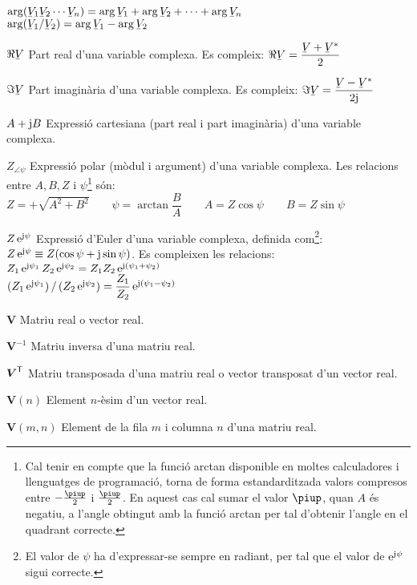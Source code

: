 \begin{list}{}
      $\arg(\cmplx{V}_1 \cmplx{V}_2 \cdots \cmplx{V}_n) = \arg\cmplx{V}_1 + \arg \cmplx{V}_2 + \cdots + \arg\cmplx{V}_n$\\[1ex]
      $\arg(\cmplx{V}_1 / \cmplx{V}_2) = \arg\cmplx{V}_1 - \arg \cmplx{V}_2$
    \item[$\Re\cmplx{V}$] Part real d'una variable complexa. Es compleix: $\Re\cmplx{V} = \dfrac{\cmplx{V} + \cmplx{V}^*}{2}$
    \item[$\Im\cmplx{V}$] Part imaginària d'una variable complexa. Es compleix: $\Im\cmplx{V} = \dfrac{\cmplx{V} - \cmplx{V}^*}{2 \ju}$
    \item[$A+\mathrm{j} B$] Expressió cartesiana (part real i part
    imaginària) d'una variable complexa.
    \item[$Z_{\angle \psi}$] Expressió polar (mòdul i argument) d'una variable
    complexa. Les relacions entre $A, B, Z$ i $\psi$\footnote{Cal tenir en compte que la funció \textsf{arctan} disponible en moltes calculadores i llenguatges de programació, torna de forma  estandarditzada valors compresos entre $-\frac{\piup}{2}$ i $\frac{\piup}{2}$. En aquest cas cal sumar el valor $\piup$, quan $A$ és negatiu, a l'angle obtingut amb la funció \textsf{arctan} per tal d'obtenir l'angle en el quadrant correcte.} són:\\[1ex]
    $Z=+\sqrt{A^2+B^2}\quad\quad\psi=\arctan{\dfrac{B}{A}}\quad\quad
    A=Z\cos\psi\quad\quad B=Z\sin\psi$
    \item[$Z\,\mathrm{e}^{\mathrm{j}\psi}$] Expressió d'Euler d'una variable complexa, definida com\footnote{El valor de $\psi$ ha d'expressar-se sempre en radiant, per tal que el valor de $\mathrm{e}^{\mathrm{j}\psi}$ sigui correcte.}:
     $Z\,\mathrm{e}^{\mathrm{j}\psi} \equiv Z(\cos\psi+\mathrm{j}\sin\psi)$.
     Es compleixen les relacions:\\[1ex]
     $Z_1\,\mathrm{e}^{\mathrm{j}\psi_1} \, Z_2\,\mathrm{e}^{\mathrm{j}\psi_2} = Z_1 Z_2\,\mathrm{e}^{\mathrm{j}(\psi_1+\psi_2)}$\\[1ex]
     $(Z_1\,\mathrm{e}^{\mathrm{j}\psi_1}) \,/\, (Z_2\,\mathrm{e}^{\mathrm{j}\psi_2}) = \dfrac{Z_1}{Z_2}\,\mathrm{e}^{\mathrm{j}(\psi_1-\psi_2)}$
    \item[$\boldsymbol{V}$] Matriu real o  vector real.
    \item[$\boldsymbol{V}^{-1}$] Matriu inversa d'una matriu real.
    \item[$\boldsymbol{V}^\mathrm{\textsf{T}}$] Matriu transposada d'una matriu real o vector
    transposat d'un vector real.
    \item[$\boldsymbol{V}(n)$] Element $n$-èsim d'un vector real.
    \item[$\boldsymbol{V}(m,n)$] Element de la fila $m$ i columna $n$ d'una matriu real.

\end{list}
